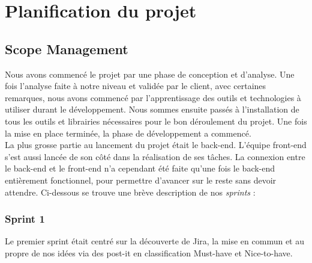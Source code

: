 \documentclass[t, 12pt, usenames,dvipsnames]{article}
\begin{document}
    
    
    \newpage
    
    \section{Planification du projet}
        \subsection{Scope Management}
        \noindent Nous avons commencé le projet par une phase de conception et d'analyse. Une fois l'analyse faite à notre niveau et validée par le client, avec certaines remarques, nous avons commencé par l'apprentissage des outils et technologies à utiliser durant le développement. Nous sommes ensuite passés à l'installation de tous les outils et librairies nécessaires pour le bon déroulement du projet. Une fois la mise en place terminée, la phase de développement a commencé.\\
        La plus grosse partie au lancement du projet était le back-end. L'équipe front-end s'est aussi lancée de son côté dans la réalisation de ses tâches. La connexion entre le back-end et le front-end n'a cependant été faite qu'une fois le back-end entièrement fonctionnel, pour permettre d'avancer sur le reste sans devoir attendre.
        Ci-dessous se trouve une brève description de nos \textit{sprints} : 

            \subsubsection{Sprint 1}
                \noindent Le premier sprint était centré sur la découverte de  Jira, la mise en commun et au propre de nos idées via des post-it en classification Must-have et Nice-to-have. 
                
\end{document}
